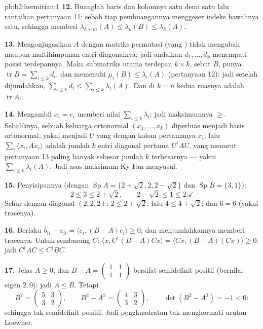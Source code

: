 \begin{solution}{pb:b2:hermitian:1}
\textbf{12.} Buanglah baris dan kolomnya satu demi satu lalu rantaikan
pertanyaan 11: sebab tiap pembuangannya menggeser indeks bawahnya satu, sehingga memberi
$\lambda_{k+m}(A) \leq \lambda_k(B) \leq \lambda_k(A)$.

\textbf{13.} Mengonjugasikan $A$ dengan matriks permutasi (yang )
tidak mengubah  maupun multihimpunan entri
diagonalnya: jadi andaikan $d_1, \dots, d_k$ menempati posisi terdepannya.
Maka submatriks utama terdepan $k\times k$, sebut $B$, punya
$\operatorname{tr} B = \sum_{i\leq k}d_i$, dan 
memenuhi $\mu_i(B) \leq \lambda_i(A)$ (pertanyaan 12): jadi setelah dijumlahkan,
$\sum_{i\leq k}d_i \leq \sum_{i\leq k}\lambda_i(A)$. Dan di $k =
n$ kedua ruasnya adalah $\operatorname{tr} A$.

\textbf{14.} Mengambil $x_i = e_i$ memberi nilai
$\sum_{i\leq k}\lambda_i$: jadi maksimumnya $\geq$. Sebaliknya, sebuah
keluarga ortonormal $(x_1, \dots, x_k)$ diperluas menjadi
basis ortonormal, yakni menjadi $U$ yang  dengan kolom pertamanya
$x_i$; lalu $\sum_i\langle x_i, Ax_i\rangle$ adalah jumlah
$k$ entri diagonal pertama $U^\dagger AU$, yang menurut pertanyaan
13 paling banyak sebesar jumlah $k$  terbesarnya ---
yakni $\sum_{i\leq k}\lambda_i(A)$. Jadi asas maksimum Ky Fan
menyusul.

\textbf{15.} Penyisipannya (dengan $\operatorname{Sp}A = \{2+\sqrt2, 2,
2-\sqrt2\}$ dan $\operatorname{Sp}B = \{3, 1\}$):
\[
2 \leq 3 \leq 2 + \sqrt2,
\qquad
2 - \sqrt2 \leq 1 \leq 2 . \checkmark
\]
Schur dengan diagonal $(2,2,2)$: $2 \leq 2+\sqrt2$; lalu $4 \leq 4 +
\sqrt2$; dan $6 = 6$ (yakni tracenya). \checkmark

\textbf{16.} Berlaku $b_{ii} - a_{ii} = \langle e_i, (B-A)e_i\rangle
\geq 0$; dan menjumlahkannya memberi tracenya. Untuk sembarang $C$: $\langle x,
C^\dagger(B - A)Cx\rangle = \langle Cx, (B-A)(Cx)\rangle \geq
0$: jadi $C^\dagger AC \leq C^\dagger BC$.

\textbf{17.} Jelas $A \geq 0$; dan $B - A = \begin{pmatrix} 1 & 1\\
1 & 1\end{pmatrix}$ bersifat semidefinit positif (bernilai eigen $2,
0$): jadi $A \leq B$. Tetapi
\[
B^2 = \begin{pmatrix} 5 & 3\\ 3 & 2\end{pmatrix},
\qquad
B^2 - A^2 = \begin{pmatrix} 4 & 3\\ 3 & 2\end{pmatrix},
\qquad \det(B^2 - A^2) = -1 < 0 :
\]
sehingga tak semidefinit positif. Jadi pengkuadratan tak menghormati
urutan Loewner.


\end{solution}
